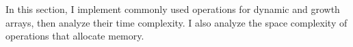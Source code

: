 In this section, I implement commonly used operations for dynamic and growth arrays, then analyze their time complexity. I also analyze the space complexity of operations that allocate memory.